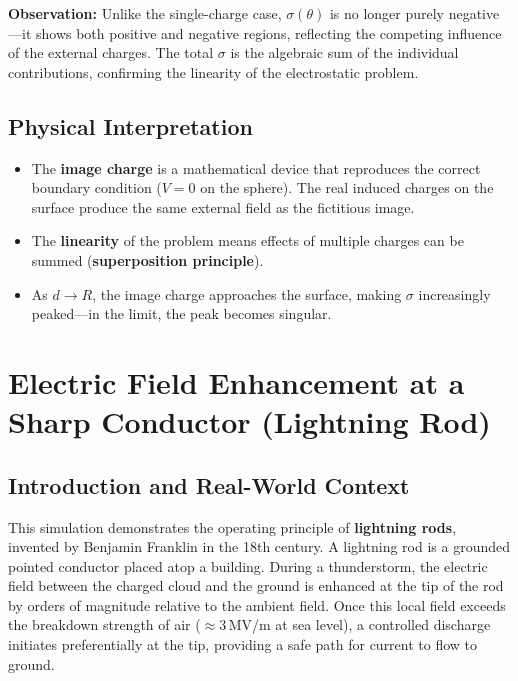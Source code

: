\documentclass[11pt,a4paper]{article}
\begin{document}
\textbf{Observation:} Unlike the single-charge case, $\sigma(\theta)$ is no longer purely negative---it shows both positive and negative regions, reflecting the competing influence of the external charges. The total $\sigma$ is the algebraic sum of the individual contributions, confirming the linearity of the electrostatic problem.

\subsection{Physical Interpretation}
\begin{itemize}[leftmargin=2em]
\item The \textbf{image charge} is a mathematical device that reproduces the correct boundary condition ($V=0$ on the sphere). The real induced charges on the surface produce the same external field as the fictitious image.
\item The \textbf{linearity} of the problem means effects of multiple charges can be summed (\textbf{superposition principle}).
\item As $d \to R$, the image charge approaches the surface, making $\sigma$ increasingly peaked---in the limit, the peak becomes singular.
\end{itemize}

\newpage

\section{Electric Field Enhancement at a Sharp Conductor (Lightning Rod)}

\subsection{Introduction and Real-World Context}

This simulation demonstrates the operating principle of \textbf{lightning rods}, invented by Benjamin Franklin in the 18th century. A lightning rod is a grounded pointed conductor placed atop a building. During a thunderstorm, the electric field between the charged cloud and the ground is enhanced at the tip of the rod by orders of magnitude relative to the ambient field. Once this local field exceeds the breakdown strength of air (${\approx}3$\,MV/m at sea level), a controlled discharge initiates preferentially at the tip, providing a safe path for current to flow to ground.
\end{document}
